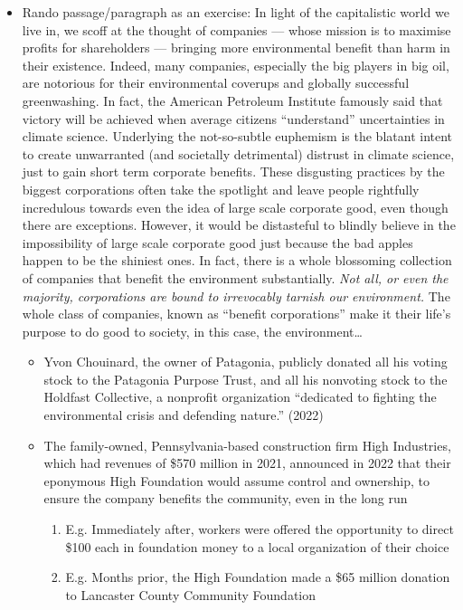 \documentclass[oneside]{book}
\begin{document}
\begin{enumerate}
\begin{itemize}
        \item Rando passage/paragraph as an exercise: In light of the capitalistic world we live in, we scoff at the thought of companies --- whose mission is to maximise profits for shareholders --- bringing more environmental benefit than harm in their existence. Indeed, many companies, especially the big players in big oil, are notorious for their environmental coverups and globally successful greenwashing. In fact, the American Petroleum Institute famously said that victory will be achieved when average citizens ``understand'' uncertainties in climate science. Underlying the not-so-subtle euphemism is the blatant intent to create unwarranted (and societally detrimental) distrust in climate science, just to gain short term corporate benefits. These disgusting practices by the biggest corporations often take the spotlight and leave people rightfully incredulous towards even the idea of large scale corporate good, even though there are exceptions. However, it would be distasteful to blindly believe in the impossibility of large scale corporate good just because the bad apples happen to be the shiniest ones. In fact, there is a whole blossoming collection of companies that benefit the environment substantially. \emph{Not all, or even the majority, corporations are bound to irrevocably tarnish our environment.} The whole class of companies, known as ``benefit corporations'' make it their life's purpose to do good to society, in this case, the environment\ldots
        \begin{itemize}
            \item Yvon Chouinard, the owner of Patagonia, publicly donated all his voting stock to the Patagonia Purpose Trust, and all his nonvoting stock to the Holdfast Collective, a nonprofit organization “dedicated to fighting the environmental crisis and defending nature.” (2022)
            \item The family-owned, Pennsylvania-based construction firm High Industries, which had revenues of \$570 million in 2021, announced in 2022 that their eponymous High Foundation would assume control and ownership, to ensure the company benefits the community, even in the long run
            \begin{enumerate}
                \item E.g. Immediately after, workers were offered the opportunity to direct \$100 each in foundation money to a local organization of their choice
                \item E.g. Months prior, the High Foundation made a \$65 million donation to Lancaster County Community Foundation

\end{enumerate}
\end{itemize}
\end{itemize}
\end{enumerate}
\end{document}
